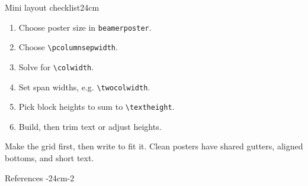 \documentclass[final]{beamer}
\newlength{\colwidth}
\newlength{\twocolwidth}
\begin{document}
\begin{pframe}
\begin{pcolumn}{\twocolwidth}
\begin{prow}
\begin{pcolumn}{\colwidth}
				\begin{pblock}[example]{Mini layout checklist}{24cm}

					\begin{enumerate}
						\item Choose poster size in \texttt{beamerposter}.
						\item Choose \texttt{\textbackslash pcolumnsepwidth}.
						\item Solve for \texttt{\textbackslash colwidth}.
						\item Set span widths, e.g. \texttt{\textbackslash twocolwidth}.
						\item Pick block heights to sum to \texttt{\textbackslash textheight}.
						\item Build, then trim text or adjust heights.
					\end{enumerate}


					Make the grid first, then write to fit it. Clean posters have shared gutters, aligned bottoms, and short text.

				\end{pblock}


				\begin{pblock}{References}{
						\textheight-24cm-24cm-2\blocksepheight
					}

					\nocite{*}
					\footnotesize{}

				\end{pblock}

			\end{pcolumn}
		\end{prow}

	\end{pcolumn}
\end{pframe}
\end{document}
